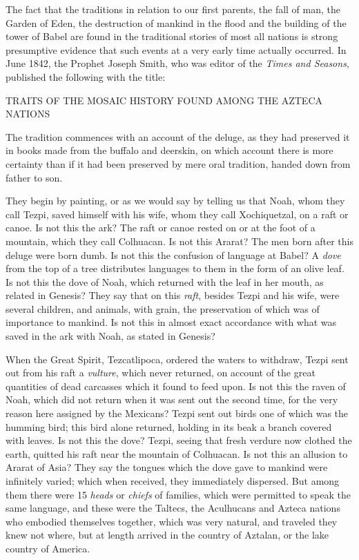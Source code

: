 The fact that the traditions in relation to our first parents, the fall of man, the Garden of Eden,
the destruction of mankind in the flood and the building of the tower of Babel are found in
the traditional stories of most all nations is strong presumptive evidence that such events at a
very early time actually occurred. In June 1842, the Prophet Joseph Smith, who was editor of
the \textit{Times and Seasons}, published the following with the title:

TRAITS OF THE MOSAIC HISTORY FOUND AMONG THE AZTECA NATIONS

The tradition commences with an account of the deluge, as they had preserved it in books
made from the buffalo and deerskin, on which account there is more certainty than if it had
been preserved by mere oral tradition, handed down from father to son.

They begin by painting, or as we would say by telling us that Noah, whom they call Tezpi,
saved himself with his wife, whom they call Xochiquetzal, on a raft or canoe. Is not this the
ark? The raft or canoe rested on or at the foot of a mountain, which they call Colhuacan. Is
not this Ararat? The men born after this deluge were born dumb. Is not this the confusion of
language at Babel? A \textit{dove} from the top of a tree distributes languages to them in the form of
an olive leaf. Is not this the dove of Noah, which returned with the leaf in her mouth, as
related in Genesis? They say that on this \textit{raft}, besides Tezpi and his wife, were several
children, and animals, with grain, the preservation of which was of importance to mankind. Is
not this in almost exact accordance with what was saved in the ark with Noah, as stated in
Genesis?

When the Great Spirit, Tezcatlipoca, ordered the waters to withdraw, Tezpi sent out from his
raft a \textit{vulture}, which never returned, on account of the great quantities of dead carcasses
which it found to feed upon. Is not this the raven of Noah, which did not return when it was
sent out the second time, for the very reason here assigned by the Mexicans? Tezpi sent out
birds one of which was the humming bird; this bird alone returned, holding in its beak a
branch covered with leaves. Is not this the dove? Tezpi, seeing that fresh verdure now
clothed the earth, quitted his raft near the mountain of Colhuacan. Is not this an allusion to
Ararat of Asia? They say the tongues which the dove gave to mankind were infinitely varied;
which when received, they immediately dispersed. But among them there were 15 \textit{heads} or
\textit{chiefs} of families, which were permitted to speak the same language, and these were the
Taltecs, the Aculhucans and Azteca nations who embodied themselves together, which was
very natural, and traveled they knew not where, but at length arrived in the country of
Aztalan, or the lake country of America.

